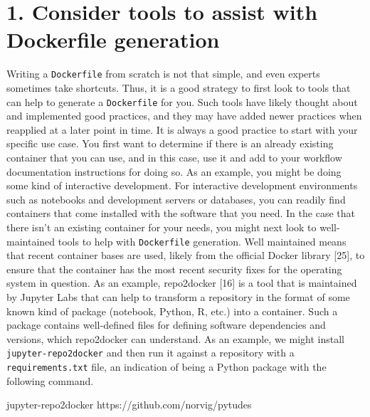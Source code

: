\documentclass[10pt,letterpaper]{article}
\newenvironment{Shaded}{\begin{snugshade}}{\end{snugshade}}
\newcommand{\ExtensionTok}[1]{#1}
\newcommand{\NormalTok}[1]{#1}
\begin{document}
\hypertarget{consider-tools-to-assist-with-dockerfile-generation}{%
\section*{1. Consider tools to assist with Dockerfile
generation}\label{consider-tools-to-assist-with-dockerfile-generation}}

Writing a \texttt{Dockerfile} from scratch is not that simple, and even
experts sometimes take shortcuts. Thus, it is a good strategy to first
look to tools that can help to generate a \texttt{Dockerfile} for you.
Such tools have likely thought about and implemented good practices, and
they may have added newer practices when reapplied at a later point in
time. It is always a good practice to start with your specific use case.
You first want to determine if there is an already existing container
that you can use, and in this case, use it and add to your workflow
documentation instructions for doing so. As an example, you might be
doing some kind of interactive development. For interactive development
environments such as notebooks and development servers or databases, you
can readily find containers that come installed with the software that
you need. In the case that there isn't an existing container for your
needs, you might next look to well-maintained tools to help with
\texttt{Dockerfile} generation. Well maintained means that recent
container bases are used, likely from the official Docker library
{[}25{]}, to ensure that the container has the most recent security
fixes for the operating system in question. As an example, repo2docker
{[}16{]} is a tool that is maintained by Jupyter Labs that can help to
transform a repository in the format of some known kind of package
(notebook, Python, R, etc.) into a container. Such a package contains
well-defined files for defining software dependencies and versions,
which repo2docker can understand. As an example, we might install
\texttt{jupyter-repo2docker} and then run it against a repository with a
\texttt{requirements.txt} file, an indication of being a Python package
with the following command.

\begin{Shaded}
\begin{Highlighting}[]
\ExtensionTok{jupyter-repo2docker}\NormalTok{ https://github.com/norvig/pytudes}
\end{Highlighting}
\end{Shaded}
\end{document}
